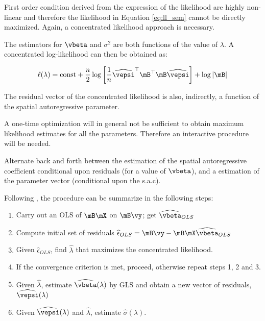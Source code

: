 First order condition derived from the expression of the likelihood are highly non-linear and therefore the likelihood in Equation \eqref{eq:ll_sem} cannot be directly maximized. Again, a concentrated likelihood approach is necessary.

The estimators for $\vbeta$ and $\sigma^2$ are both functions of the value of $\lambda$. A concentrated log-likelihood can then be obtained as:

\begin{equation}
	\ell(\lambda)= \mbox{const} + \frac{n}{2}\log\left[\frac{1}{n}\widehat{\vepsi}^\top\mB^\top\mB \widehat{\vepsi}\right] + \log\left|\mB\right|
\end{equation}

The residual vector of the concentrated likelihood is also, indirectly, a function of the spatial autoregressive parameter.

A one-time optimization will in general not be sufficient to obtain maximum likelihood estimates for all the parameters. Therefore an interactive procedure will be needed.

Alternate back and forth between the estimation of the spatial autoregressive coefficient conditional upon residuals (for a value of $\vbeta$), and a estimation of the parameter vector (conditional upon the s.a.c). 

\begin{algorithm}

Following \cite{anselin1988spatial}, the procedure can be summarize in the following steps:

\begin{enumerate}
		\item Carry out an OLS of $\mB\mX$ on $\mB\vy$; get $\widehat{\vbeta}_{OLS}$
		\item Compute initial set of residuals $\widehat{\epsilon}_{OLS} = \mB\vy - \mB\mX\widehat{\vbeta}_{OLS}$
		\item Given $\widehat{\epsilon}_{OLS} $, find $\widehat{\lambda}$ that maximizes the concentrated likelihood.
		\item If the convergence criterion is met, proceed, otherwise repeat steps 1, 2 and 3.
		\item Given $\widehat{\lambda}$, estimate $\widehat{\vbeta}(\lambda)$ by GLS and obtain a new vector of residuals, $\widehat{\vepsi}(\lambda)$
		\item Given  $\widehat{\vepsi}(\lambda)$ and $\widehat{\lambda}$, estimate $\widehat{\sigma}(\lambda)$.
\end{enumerate}	
\end{algorithm}


